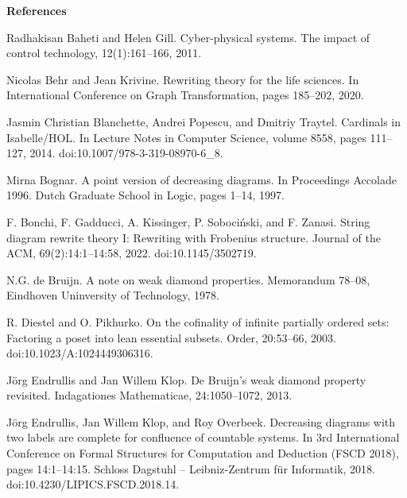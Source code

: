 
 
\par\medskip\noindent\textbf{References}\par
  
\par\noindent  [1]  Radhakisan Baheti and Helen Gill.  Cyber-physical systems.  The impact of control technology, 12(1):161–166, 2011.  
 
\par\noindent  [2]  Nicolas Behr and Jean Krivine.  Rewriting theory for the life sciences.  In International Conference on Graph Transformation, pages 185–202, 2020.  
 
\par\noindent  [3]  Jasmin Christian Blanchette, Andrei Popescu, and Dmitriy Traytel.  Cardinals in Isabelle/HOL.  In Lecture Notes in Computer Science, volume 8558, pages 111–127, 2014.  doi:10.1007/978-3-319-08970-6\_8.  
 
\par\noindent  [4]  Mirna Bognar.  A point version of decreasing diagrams.  In Proceedings Accolade 1996. Dutch Graduate School in Logic, pages 1–14, 1997.  
 
\par\noindent  [5]  F. Bonchi, F. Gadducci, A. Kissinger, P. Sobociński, and F. Zanasi.  String diagram rewrite theory I: Rewriting with Frobenius structure.  Journal of the ACM, 69(2):14:1–14:58, 2022.  doi:10.1145/3502719.  
 
\par\noindent  [6]  N.G. de Bruijn.  A note on weak diamond properties.  Memorandum 78–08, Eindhoven Uninversity of Technology, 1978.  
 
\par\noindent  [7]  R. Diestel and O. Pikhurko.  On the cofinality of infinite partially ordered sets: Factoring a poset into lean essential subsets.  Order, 20:53–66, 2003.  doi:10.1023/A:1024449306316.  
 
\par\noindent  [8]  Jörg Endrullis and Jan Willem Klop.  De Bruijn’s weak diamond property revisited.  Indagationes Mathematicae, 24:1050–1072, 2013.  
 
\par\noindent  [9]  Jörg Endrullis, Jan Willem Klop, and Roy Overbeek.  Decreasing diagrams with two labels are complete for confluence of countable systems.  In 3rd International Conference on Formal Structures for Computation and Deduction (FSCD 2018), pages 14:1–14:15. Schloss Dagstuhl – Leibniz-Zentrum für Informatik, 2018.  doi:10.4230/LIPICS.FSCD.2018.14.  
 
